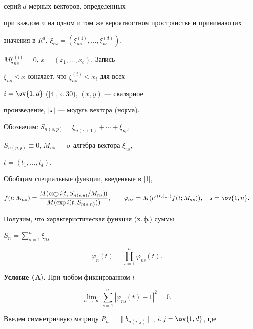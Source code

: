 серий $d$-мерных векторов, определенных 


при каждом $n$ на одном и том же вероятностном пространстве и принимающих 


значения в $R^d$, $\xi_{ns}=(\xi^{(1)}_{ns},\dotsc,\xi^{(d)}_{ns})$, 


$M\xi^{(i)}_{ns}=0$, $x=(x_1,\dotsc,x_d)$. Запись 


$\xi_{ns}\le x$ означает, что $\xi^{(i)}_{ns}\le x_i$ для всех 


$i=\ov{1,d}$ ([4], с.\,30), $(x,y)$ --- скалярное 


произведение, $|x|$ --- модуль вектора (норма). 


 


Обозначим: $S_{n(s,p)}=\xi_{n(s+1)}+\dotsb+\xi_{np}$, 


$S_{n(p,p)}\equiv 0$, $M_{ns}$ --- $\sigma$-алгебра вектора $\xi_{ns}$, 


$t=(t_1,\dotsc,t_d)$. 


Обобщим специальные функции, введенные в [1], 


$$ 


f(t;M_{ns})= 


\frac{M(\exp i(t,S_{n(s,n)}/M_{ns}))} 


{M(\exp i(t,S_{n(s,n)}))},\qquad 


\varphi_{ns}=M(e^{i(t,\xi_{ns})}f(t;M_{ns})),\quad 


s=\ov{1,n}. 


$$ 


Получим, что характеристическая функция (х.\,ф.) суммы 


$S_n=\sum\limits^n_{s=1}\xi_{ns}$


$$ 


\varphi_n(t)=\prod^n_{s=1}\varphi_{ns}(t). 


$$ 


 


{\bf Условие (A).} При любом фиксированном $t$ 


\begin{equation} 


\lim_{n\to\infty}\sum^n_{s=1}|\varphi_{ns}(t)-1|^2=0. 


\tag{A} 


\end{equation} 


 


Введем симметричную матрицу $B_n=\|b_{n(i,j)}\|$, $i,j=\ov{1,d}$, где 


